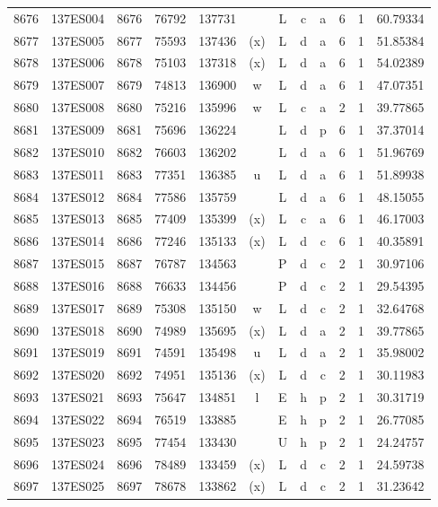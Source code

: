 \begin{tabular}{|*{12}{c|}}
8676 & 137ES004 & 8676 & 76792 & 137731 &  & L & c & a & 6 & 1 & 60.79334 \\ 
8677 & 137ES005 & 8677 & 75593 & 137436 & (x) & L & d & a & 6 & 1 & 51.85384 \\ 
8678 & 137ES006 & 8678 & 75103 & 137318 & (x) & L & d & a & 6 & 1 & 54.02389 \\ 
8679 & 137ES007 & 8679 & 74813 & 136900 & w & L & d & a & 6 & 1 & 47.07351 \\ 
8680 & 137ES008 & 8680 & 75216 & 135996 & w & L & c & a & 2 & 1 & 39.77865 \\ 
8681 & 137ES009 & 8681 & 75696 & 136224 &  & L & d & p & 6 & 1 & 37.37014 \\ 
8682 & 137ES010 & 8682 & 76603 & 136202 &  & L & d & a & 6 & 1 & 51.96769 \\ 
8683 & 137ES011 & 8683 & 77351 & 136385 & u & L & d & a & 6 & 1 & 51.89938 \\ 
8684 & 137ES012 & 8684 & 77586 & 135759 &  & L & d & a & 6 & 1 & 48.15055 \\ 
8685 & 137ES013 & 8685 & 77409 & 135399 & (x) & L & c & a & 6 & 1 & 46.17003 \\ 
8686 & 137ES014 & 8686 & 77246 & 135133 & (x) & L & d & c & 6 & 1 & 40.35891 \\ 
8687 & 137ES015 & 8687 & 76787 & 134563 &  & P & d & c & 2 & 1 & 30.97106 \\ 
8688 & 137ES016 & 8688 & 76633 & 134456 &  & P & d & c & 2 & 1 & 29.54395 \\ 
8689 & 137ES017 & 8689 & 75308 & 135150 & w & L & d & c & 2 & 1 & 32.64768 \\ 
8690 & 137ES018 & 8690 & 74989 & 135695 & (x) & L & d & a & 2 & 1 & 39.77865 \\ 
8691 & 137ES019 & 8691 & 74591 & 135498 & u & L & d & a & 2 & 1 & 35.98002 \\ 
8692 & 137ES020 & 8692 & 74951 & 135136 & (x) & L & d & c & 2 & 1 & 30.11983 \\ 
8693 & 137ES021 & 8693 & 75647 & 134851 & l & E & h & p & 2 & 1 & 30.31719 \\ 
8694 & 137ES022 & 8694 & 76519 & 133885 &  & E & h & p & 2 & 1 & 26.77085 \\ 
8695 & 137ES023 & 8695 & 77454 & 133430 &  & U & h & p & 2 & 1 & 24.24757 \\ 
8696 & 137ES024 & 8696 & 78489 & 133459 & (x) & L & d & c & 2 & 1 & 24.59738 \\ 
8697 & 137ES025 & 8697 & 78678 & 133862 & (x) & L & d & c & 2 & 1 & 31.23642 \\ 

\end{tabular}
